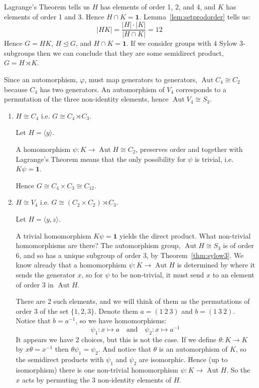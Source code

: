 \documentclass[a4paper, oneside, 12pt, final]{article}
\theoremstyle{definition}
\DeclareMathOperator{\Aut}{Aut}
\begin{document}
Lagrange's Theorem tells us \(H\) has elements of order 1, 2, and 4, and \(K\) has elements of order 1 and 3.
Hence \(H \cap K = \bm{1}\).
Lemma~\ref{lem:setprodorder} tells us:
\[|HK| = \frac{|H| \cdot |K|}{|H \cap K|} = 12\]
Hence \(G = HK\), \(H \unlhd G\), and \(H \cap K = \bm{1}\).
If we consider groups with 4 Sylow 3-subgroups then we can conclude that they are some semidirect product, \(G = H
\rtimes K\).

Since an automorphism, \(\varphi\), must map generators to generators, \(\Aut{C_4} \cong C_2\) because \(C_4\) has two
generators.
An automorphism of \(V_4\) corresponds to a permutation of the three
non-identity elements, hence \(\Aut{V_4} \cong S_3\).

\begin{enumerate}
    \item \(H \cong C_4\) i.e. \(G \cong C_4 \rtimes C_3\).

        Let \(H = \langle y \rangle\).

        A homomorphism \(\psi:K \to \Aut{H} \cong C_2\), preserves order and together with Lagrange's Theorem means that
        the only possibility for \(\psi\) is trivial, i.e. \(K\psi = \bm{1}\).

        Hence \(G \cong C_4 \times C_3 \cong C_{12}\).

    \item \(H \cong V_4\) i.e. \(G \cong (C_2 \times C_2) \rtimes C_3\).

        Let \(H = \langle y, z \rangle\).

        A trivial homomorphism \(K\psi = \bm{1}\) yields the direct product.
        What non-trivial homomorphisms are there?
        The automorphism group, \(\Aut{H} \cong S_3\) is of order 6, and so has a unique subgroup of order 3, by
        Theorem~\ref{thm:sylow3}.
        We know already that a homomorphism \(\psi: K \to \Aut{H}\) is determined by where it sends the generator
        \(x\), so for \(\psi\) to be non-trivial, it must send \(x\) to an element of order 3 in \(\Aut{H}\).

        There are 2 such elements, and we will think of them as the permutations of order 3 of the set \(\{1, 2, 3\}\).
        Denote them \(a = (1\ 2\ 3)\) and \(b = (1\ 3\ 2)\).
        Notice that \(b = a^{-1}\), so we have homomorphisms:
        \[\psi_1:x \mapsto a \quad \text{and} \quad \psi_2:x \mapsto a^{-1}\]
        It appears we have 2 choices, but this is not the case.
        If we define \(\theta:K \to K\) by \(x\theta = x^{-1}\) then \(\theta\psi_1 = \psi_2\).
        And notice that \(\theta\) is an automorphism of \(K\), so the semidirect products with \(\psi_1\) and \(\psi_2\)
        are isomorphic.
        Hence (up to isomorphism) there is one non-trivial homomorphism \(\psi:K \to \Aut{H}\).
        So the \(x\) acts by permuting the 3 non-identity elements of \(H\).


\end{enumerate}
\end{document}
